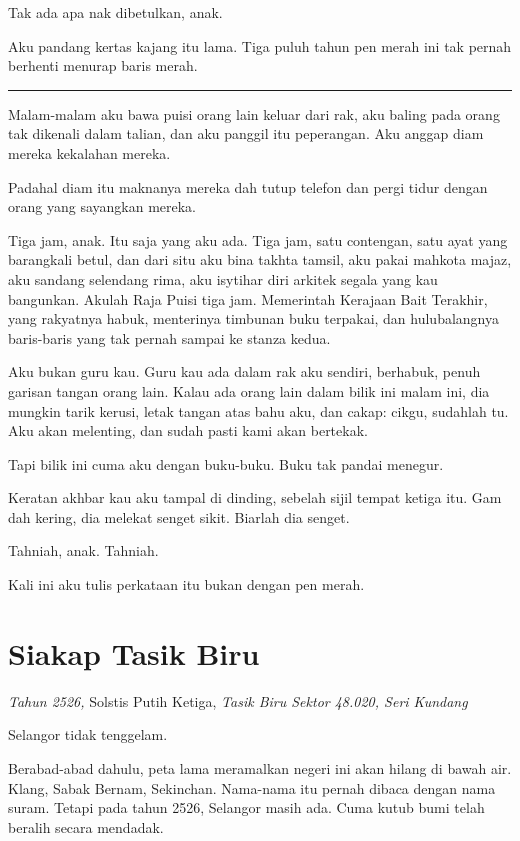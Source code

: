 \documentclass[
  11pt,
  a5paper,
  openany,
  oneside]{book}
\begin{document}
Tak ada apa nak dibetulkan, anak.

Aku pandang kertas kajang itu lama. Tiga puluh tahun pen merah ini tak
pernah berhenti menurap baris merah.

\begin{center}\rule{0.5\linewidth}{0.5pt}\end{center}

Malam-malam aku bawa puisi orang lain keluar dari rak, aku baling pada
orang tak dikenali dalam talian, dan aku panggil itu peperangan. Aku
anggap diam mereka kekalahan mereka.

Padahal diam itu maknanya mereka dah tutup telefon dan pergi tidur
dengan orang yang sayangkan mereka.

Tiga jam, anak. Itu saja yang aku ada. Tiga jam, satu contengan, satu
ayat yang barangkali betul, dan dari situ aku bina takhta tamsil, aku
pakai mahkota majaz, aku sandang selendang rima, aku isytihar diri
arkitek segala yang kau bangunkan. Akulah Raja Puisi tiga jam.
Memerintah Kerajaan Bait Terakhir, yang rakyatnya habuk, menterinya
timbunan buku terpakai, dan hulubalangnya baris-baris yang tak pernah
sampai ke stanza kedua.

Aku bukan guru kau. Guru kau ada dalam rak aku sendiri, berhabuk, penuh
garisan tangan orang lain. Kalau ada orang lain dalam bilik ini malam
ini, dia mungkin tarik kerusi, letak tangan atas bahu aku, dan cakap:
cikgu, sudahlah tu. Aku akan melenting, dan sudah pasti kami akan
bertekak.

Tapi bilik ini cuma aku dengan buku-buku. Buku tak pandai menegur.

Keratan akhbar kau aku tampal di dinding, sebelah sijil tempat ketiga
itu. Gam dah kering, dia melekat senget sikit. Biarlah dia senget.

Tahniah, anak. Tahniah.

Kali ini aku tulis perkataan itu bukan dengan pen merah.

\chapter{Siakap Tasik Biru}\label{siakap-tasik-biru}

\emph{Tahun 2526,} Solstis Putih Ketiga, \emph{Tasik Biru Sektor 48.020,
Seri Kundang}

Selangor tidak tenggelam.

Berabad-abad dahulu, peta lama meramalkan negeri ini akan hilang di
bawah air. Klang, Sabak Bernam, Sekinchan. Nama-nama itu pernah dibaca
dengan nama suram. Tetapi pada tahun 2526, Selangor masih ada. Cuma
kutub bumi telah beralih secara mendadak.
\end{document}
